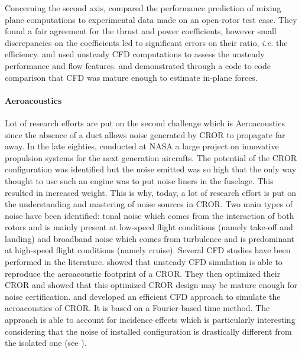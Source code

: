 Concerning the second axis, \citet{Zachariadis2011}
compared the performance prediction of mixing plane computations
to experimental data made on an open-rotor test case.
They found a fair agreement for the thrust and power coefficients, however
small discrepancies on the coefficients led to significant errors on their ratio,
\emph{i.e.} the efficiency.
\citet{Vion2011} and \citet{Stuermer2008} used unsteady
CFD computations to assess the unsteady performance and flow features.
\citet{Stuermer2008} and \citet{Francois2013} demonstrated through a code to code comparison
that CFD was mature enough to estimate in-plane forces.

\paragraph{Aeroacoustics}
Lot of research efforts are put on the second challenge which
is Aeroacoustics since the absence of a duct allows noise generated
by CROR to propagate far away.
In the late eighties, \citet{Hager1988}
conducted at NASA a large project on innovative propulsion systems for the
next generation aircrafts. The potential of the CROR configuration
was identified but the noise emitted was so high that the only way
thought to use such an engine was to put noise liners in the fuselage. This resulted in 
increased weight. This is why, today, a lot of research effort is put on the
understanding and mastering of noise sources in CROR.
Two main types of noise have been identified: tonal noise which comes from
the interaction of both rotors and is mainly present at low-speed flight conditions 
(namely take-off and landing)
and broadband noise which comes from turbulence and is predominant
at high-speed flight conditions (namely cruise).
Several CFD studies have been performed in the literature.
\citet{Peters2012} showed that unsteady CFD simulation is able
to reproduce the aeroacoustic footprint of a CROR. They then optimized
their CROR and showed that this optimized CROR design may be mature enough
for noise certification. \citet{Hoffer2012} and \citet{Ferrante2013}
developed an efficient CFD approach to simulate the aeroacoustics of CROR.
It is based on a Fourier-based time method. The approach is able to
account for incidence effects which is particularly interesting
considering that the noise of installed configuration is drastically
different from the isolated one (see \citet{Hager1988}).

